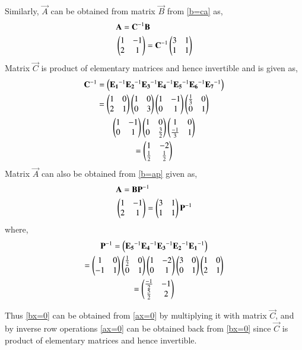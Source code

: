 \documentclass[journal,12pt,twocolumn]{IEEEtran}
\begin{document}
Similarly, $\vec{A}$ can be obtained from matrix $\vec{B}$ from \eqref{b=ca} as, 
\begin{align}
    &\mathbf{A} = \mathbf{C}^{-1}\mathbf{B}\label{a=c-1b}\\
    &\begin{pmatrix}1&-1\\2&1\end{pmatrix} = \mathbf{C}^{-1}\begin{pmatrix}3&1\\1&1\end{pmatrix} \label{eq:c-1b}
\end{align}
Matrix $\vec{C}$ is product of elementary matrices and hence invertible and is given as,
\begin{multline}
    \mathbf{C}^{-1} = \left(\mathbf{E_1}^{-1}\mathbf{E_2}^{-1}\mathbf{E_3}^{-1}\mathbf{E_4}^{-1}
    \mathbf{E_5}^{-1}\mathbf{E_6}^{-1}\mathbf{E_7}^{-1}\right) \\
    =\begin{pmatrix}1&0\\2&1\end{pmatrix}\begin{pmatrix}1&0\\0&3\end{pmatrix}\begin{pmatrix}1&-1\\0&1\end{pmatrix}\begin{pmatrix}\frac{1}{3}&0\\0&1\end{pmatrix}\\
    \begin{pmatrix}1&-1\\0&1\end{pmatrix}\begin{pmatrix}1&0\\0&\frac{3}{2}\end{pmatrix}\begin{pmatrix}1&0\\ \frac{-1}{3}&1\end{pmatrix}\\
    =\begin{pmatrix}1&-2\\ \frac{1}{2}&\frac{1}{2}\end{pmatrix}
\end{multline}
Matrix $\vec{A}$ can also be obtained from \eqref{b=ap} given as, 
\begin{align}
    &\mathbf{A} = \mathbf{B}\mathbf{P}^{-1} \\
    &\begin{pmatrix}1&-1\\2&1\end{pmatrix} = \begin{pmatrix}3&1\\1&1\end{pmatrix}\mathbf{P}^{-1}
\end{align}
where, 
\begin{multline}
    \mathbf{P}^{-1} = \left(\mathbf{E_5}^{-1}\mathbf{E_4}^{-1}\mathbf{E_3}^{-1}\mathbf{E_2}^{-1}\mathbf{E_1}^{-1}\right) \\
    = \begin{pmatrix}1&0\\-1&1\end{pmatrix}\begin{pmatrix}\frac{1}{2}&0\\0&1\end{pmatrix}\begin{pmatrix}1&-2\\0&1\end{pmatrix}\begin{pmatrix}3&0\\0&1\end{pmatrix}\begin{pmatrix}1&0\\2&1\end{pmatrix} \\
    =\begin{pmatrix}\frac{-1}{2}&-1\\ \frac{5}{2}&2\end{pmatrix}
\end{multline}

Thus \eqref{bx=0} can be obtained from \eqref{ax=0} by multiplying it with matrix $\vec{C}$, and by inverse row operations \eqref{ax=0} can be obtained back from \eqref{bx=0} since $\vec{C}$ is product of elementary matrices and hence invertible. 
\end{document}
